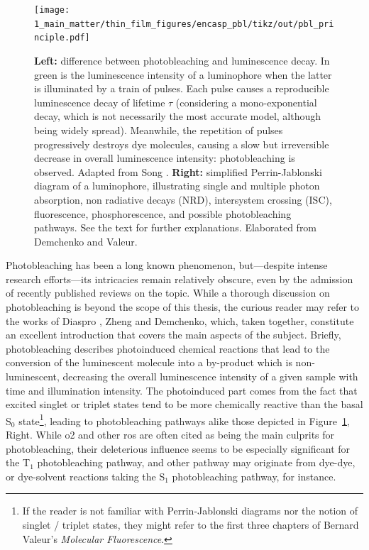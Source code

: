 \begin{figure}
	\centering
	\texttt{[image: 1\_main\_matter/thin\_film\_figures/encasp\_pbl/tikz/out/pbl\_principle.pdf]}
	\caption[Difference between luminescence decay and photobleaching, and possible photobleaching pathways.]{\textbf{Left:} difference between photobleaching and luminescence decay. In green is the luminescence intensity of a luminophore when the latter is illuminated by a train of pulses. Each pulse causes a reproducible luminescence decay of lifetime $\tau$ (considering a mono-exponential decay, which is not necessarily the most accurate model, although being widely spread\cite{wlodarczyk2003}). Meanwhile, the repetition of pulses progressively destroys dye molecules, causing a slow but irreversible decrease in overall luminescence intensity: photobleaching is observed. Adapted from Song \etal{}\cite{song1995}. \textbf{Right:} simplified Perrin-Jablonski diagram of a luminophore, illustrating single and multiple photon absorption, non radiative decays (NRD), intersystem crossing (ISC), fluorescence, phosphorescence, and possible photobleaching pathways. See the text for further explanations. Elaborated from Demchenko\cite{demchenko2020} and Valeur\cite[Chap.~3]{valeur2012molecfluo}.}
	\label{fig:thin_film:pbl:pbl_principle}
\end{figure}

Photobleaching has been a long known phenomenon, but---despite intense research efforts---its intricacies remain relatively obscure, even by the admission of recently published reviews on the topic\cite{zheng2017pbl, demchenko2020}. While a thorough discussion on photobleaching is beyond the scope of this thesis, the curious reader may refer to the works of Diaspro \etal{}\cite{diaspro2006}, Zheng \etal{}\cite{zheng2017pbl} and Demchenko\cite{demchenko2020}, which, taken together, constitute an excellent introduction that covers the main aspects of the subject. Briefly, photobleaching describes photoinduced chemical reactions that lead to the conversion of the luminescent molecule into a by-product which is non-luminescent, decreasing the overall luminescence intensity of a given sample with time and illumination intensity. The photoinduced part comes from the fact that excited singlet or triplet states tend to be more chemically reactive than the basal S$_0$ state\footnote{If the reader is not familiar with Perrin-Jablonski diagrams nor the notion of singlet / triplet states, they might refer to the first three chapters of Bernard Valeur's \textit{Molecular Fluorescence}\cite{valeur2012molecfluo}.}, leading to photobleaching pathways alike those depicted in Figure~\ref{fig:thin_film:pbl:pbl_principle}, Right. While \gls{o2} and other \gls{ros} are often cited as being the main culprits for photobleaching, their deleterious influence seems to be especially significant for the T$_1$ photobleaching pathway, and other pathway may originate from dye-dye, or dye-solvent reactions taking the S$_1$ photobleaching pathway, for instance\cite{hinkeldey2008}.

